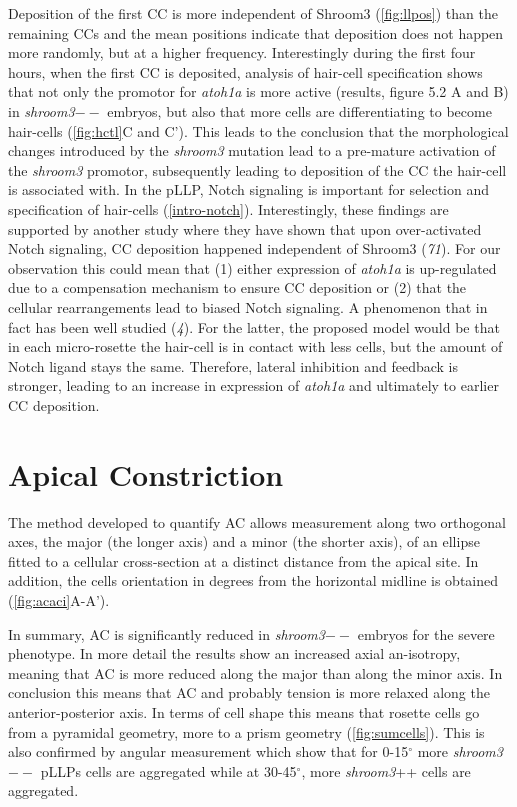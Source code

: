 \documentclass[11pt,singlespacinge,twoside]{reedthesis} %
\begin{document}
Deposition of the first CC is more independent of Shroom3 (\ref{fig:llpos}) than the remaining CCs and the mean positions indicate that deposition does not happen more randomly, but at a higher frequency. Interestingly during the first four hours, when the first CC is deposited, analysis of hair-cell specification shows that not only the promotor for \emph{atoh1a} is more active (results, figure 5.2 A and B) in \emph{shroom3}\(--\) embryos, but also that more cells are differentiating to become hair-cells (\ref{fig:hctl}C and C'). This leads to the conclusion that the morphological changes introduced by the \emph{shroom3} mutation lead to a pre-mature activation of the \emph{shroom3} promotor, subsequently leading to deposition of the CC the hair-cell is associated with.
In the pLLP, Notch signaling is important for selection and specification of hair-cells (\ref{intro-notch}). Interestingly, these findings are supported by another study where they have shown that upon over-activated Notch signaling, CC deposition happened independent of Shroom3 (\emph{71}). For our observation this could mean that (1) either expression of \emph{atoh1a} is up-regulated due to a compensation mechanism to ensure CC deposition or (2) that the cellular rearrangements lead to biased Notch signaling. A phenomenon that in fact has been well studied (\emph{4}). For the latter, the proposed model would be that in each micro-rosette the hair-cell is in contact with less cells, but the amount of Notch ligand stays the same. Therefore, lateral inhibition and feedback is stronger, leading to an increase in expression of \emph{atoh1a} and ultimately to earlier CC deposition.

\hypertarget{apical-constriction-2}{%
\section{Apical Constriction}\label{apical-constriction-2}}

The method developed to quantify AC allows measurement along two orthogonal axes, the major (the longer axis) and a minor (the shorter axis), of an ellipse fitted to a cellular cross-section at a distinct distance from the apical site. In addition, the cells orientation in degrees from the horizontal midline is obtained (\ref{fig:acaci}A-A').

In summary, AC is significantly reduced in \emph{shroom3}\(--\) embryos for the severe phenotype. In more detail the results show an increased axial an-isotropy, meaning that AC is more reduced along the major than along the minor axis. In conclusion this means that AC and probably tension is more relaxed along the anterior-posterior axis. In terms of cell shape this means that rosette cells go from a pyramidal geometry, more to a prism geometry (\ref{fig:sumcells}). This is also confirmed by angular measurement which show that for 0-15\(^\circ\) more \emph{shroom3}\(--\) pLLPs cells are aggregated while at 30-45\(^\circ\), more \emph{shroom3}++ cells are aggregated.
\end{document}

